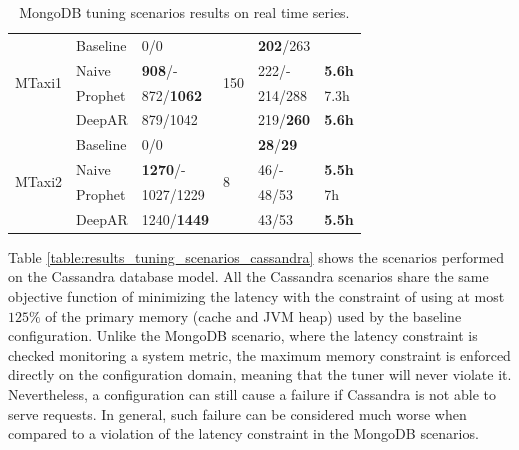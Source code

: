 \documentclass[a4paper, 12pt]{article} %
\begin{document}
\begin{table}
\begin{tabularx}{\textwidth}{@{}XXXXXX@{}}
			\midrule
			\multirow{4}{*}{MTaxi1}
			& Baseline & 0/0 & \multirow{4}{*}{150} & \textbf{202}/263 & \\
			& Naive & \textbf{908}/- && 222/- & \textbf{5.6h} \\
			& Prophet & 872/\textbf{1062} && 214/288 & 7.3h\\
			& DeepAR & 879/1042 && 219/\textbf{260} & \textbf{5.6h}\\
			
			\midrule
			\multirow{4}{*}{MTaxi2}
			& Baseline & 0/0 & \multirow{4}{*}{8} & \textbf{28}/\textbf{29} & \\
			& Naive & \textbf{1270}/- && 46/- & \textbf{5.5h} \\
			& Prophet & 1027/1229 && 48/53 & 7h\\
			& DeepAR & 1240/\textbf{1449} && 43/53 & \textbf{5.5h}\\
			
			
			\bottomrule
		\end{tabularx}
		\caption{MongoDB tuning scenarios results on real time series.} \label{table:results_mongo_real}
	\end{table}

	
	Table \ref{table:results_tuning_scenarios_cassandra} shows the scenarios performed on the Cassandra database model. All the Cassandra scenarios share the same objective function of minimizing the latency with the constraint of using at most $125\%$ of the primary memory (cache and JVM heap) used by the baseline configuration. Unlike the MongoDB scenario, where the latency constraint is checked monitoring a system metric, the maximum memory constraint is enforced directly on the configuration domain, meaning that the tuner will never violate it. Nevertheless, a configuration can still cause a failure if Cassandra is not able to serve requests. In general, such failure can be considered much worse when compared to a violation of the latency constraint in the MongoDB scenarios.
	
\end{document}
